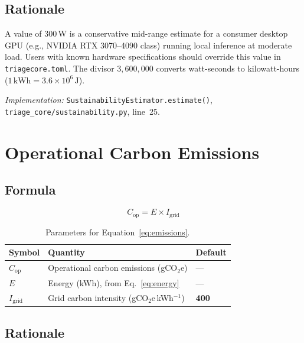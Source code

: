 \documentclass[12pt]{article}
\begin{document}
\subsection*{Rationale}

A value of 300\,W is a conservative mid-range estimate for a consumer desktop
GPU (e.g., NVIDIA RTX 3070--4090 class) running local inference at moderate
load. Users with known hardware specifications should override this value in
\texttt{triagecore.toml}. The divisor $3{,}600{,}000$ converts watt-seconds to
kilowatt-hours ($1\,\text{kWh} = 3.6 \times 10^{6}\,\text{J}$).

\textit{Implementation:} \texttt{SustainabilityEstimator.estimate()},
\texttt{triage\_core/sustainability.py}, line~25.

\section{Operational Carbon Emissions}

\subsection*{Formula}

\begin{equation}
  C_{\text{op}} = E \times I_{\text{grid}}
  \label{eq:emissions}
\end{equation}

\begin{table}[h!]
\centering
\begin{tabular}{@{}lll@{}}
\toprule
Symbol & Quantity & Default \\
\midrule
$C_{\text{op}}$    & Operational carbon emissions (gCO$_2$e)    & --- \\
$E$                & Energy (kWh), from Eq.~\ref{eq:energy}     & --- \\
$I_{\text{grid}}$  & Grid carbon intensity (gCO$_2$e\,kWh$^{-1}$) & \textbf{400} \\
\bottomrule
\end{tabular}
\caption{Parameters for Equation~\ref{eq:emissions}.}
\end{table}

\subsection*{Rationale}
\end{document}
